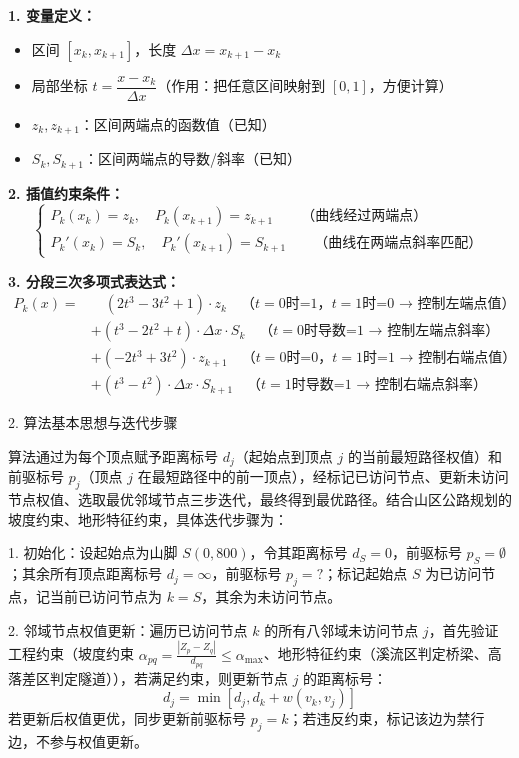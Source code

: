 \documentclass{article}
\begin{document}
	
	\noindent\textbf{1. 变量定义：}
	\begin{itemize}
		\item 区间 $[x_k, x_{k+1}]$，长度 $\Delta x = x_{k+1}-x_k$
		\item 局部坐标 $t = \dfrac{x-x_k}{\Delta x}$（作用：把任意区间映射到 $[0,1]$，方便计算）
		\item $z_k, z_{k+1}$：区间两端点的函数值（已知）
		\item $S_k, S_{k+1}$：区间两端点的导数/斜率（已知）
	\end{itemize}
	
	\medskip
	\noindent\textbf{2. 插值约束条件：}
	\[
	\begin{cases}
		P_k(x_k) = z_k,\quad P_k(x_{k+1}) = z_{k+1} \qquad \text{（曲线经过两端点）} \\
		P_k'(x_k) = S_k,\quad P_k'(x_{k+1}) = S_{k+1} \qquad \text{（曲线在两端点斜率匹配）}
	\end{cases}
	\]
	
	\medskip
	\noindent\textbf{3. 分段三次多项式表达式：}
	\[
	\begin{aligned}
		P_k(x) = &\quad (2t^3-3t^2+1) \cdot z_k \quad \text{（$t=0$时=1，$t=1$时=0 → 控制左端点值）}\\
		&+ (t^3-2t^2+t) \cdot \Delta x \cdot S_k \quad \text{（$t=0$时导数=1 → 控制左端点斜率）}\\
		&+ (-2t^3+3t^2) \cdot z_{k+1} \quad \text{（$t=0$时=0，$t=1$时=1 → 控制右端点值）}\\
		&+ (t^3-t^2) \cdot \Delta x \cdot S_{k+1} \quad \text{（$t=1$时导数=1 → 控制右端点斜率）}
	\end{aligned}
	\]
	
	\newpage
	
	
	
	
	2. 算法基本思想与迭代步骤
	
	算法通过为每个顶点赋予距离标号 \(d_j\)（起始点到顶点 \(j\) 的当前最短路径权值）和前驱标号 \(p_j\)（顶点 \(j\) 在最短路径中的前一顶点），经标记已访问节点、更新未访问节点权值、选取最优邻域节点三步迭代，最终得到最优路径。结合山区公路规划的坡度约束、地形特征约束，具体迭代步骤为：
	
	1. 初始化：设起始点为山脚 \(S(0,800)\)，令其距离标号 \(d_S=0\)，前驱标号 \(p_S=\emptyset\)；其余所有顶点距离标号 \(d_j=\infty\)，前驱标号 \(p_j=?\)；标记起始点 \(S\) 为已访问节点，记当前已访问节点为 \(k=S\)，其余为未访问节点。
	
	2. 邻域节点权值更新：遍历已访问节点 \(k\) 的所有八邻域未访问节点 \(j\)，首先验证工程约束（坡度约束 \(\alpha_{pq}=\frac{|Z_p-Z_q|}{d_{pq}} \leq \alpha_{\text{max}}\)、地形特征约束（溪流区判定桥梁、高落差区判定隧道）），若满足约束，则更新节点 \(j\) 的距离标号：
	\[
	d_j = \min\left[d_j, d_k + w(v_k,v_j)\right]
	\]
	若更新后权值更优，同步更新前驱标号 \(p_j=k\)；若违反约束，标记该边为禁行边，不参与权值更新。
	
\end{document}
